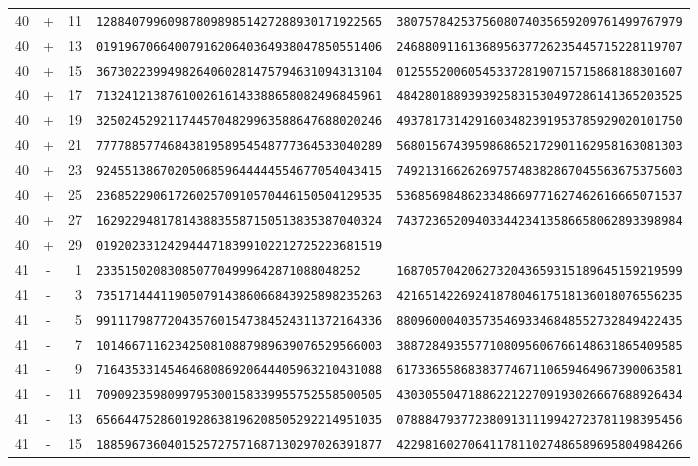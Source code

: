 \begin{longtable}{@{}rcrll@{}}
40&+&11&\texttt{1288407996098780989851427288930171922565}&\texttt{3807578425375608074035659209761499767979}\\
40&+&13&\texttt{0191967066400791620640364938047850551406}&\texttt{2468809116136895637726235445715228119707}\\
40&+&15&\texttt{3673022399498264060281475794631094313104}&\texttt{0125552006054533728190715715868188301607}\\
40&+&17&\texttt{7132412138761002616143388658082496845961}&\texttt{4842801889393925831530497286141365203525}\\
40&+&19&\texttt{3250245292117445704829963588647688020246}&\texttt{4937817314291603482391953785929020101750}\\
40&+&21&\texttt{7777885774684381958954548777364533040289}&\texttt{5680156743959868652172901162958163081303}\\
40&+&23&\texttt{9245513867020506859644444554677054043415}&\texttt{7492131662626975748382867045563675375603}\\
40&+&25&\texttt{2368522906172602570910570446150504129535}&\texttt{5368569848623348669771627462616665071537}\\
40&+&27&\texttt{1629229481781438835587150513835387040324}&\texttt{7437236520940334423413586658062893398984}\\
40&+&29&\texttt{0192023312429444718399102212725223681519}&\texttt{}\\
41&-&1&\texttt{2335150208308507704999642871088048252}&\texttt{1687057042062732043659315189645159219599}\\
41&-&3&\texttt{7351714441190507914386066843925898235263}&\texttt{4216514226924187804617518136018076556235}\\
41&-&5&\texttt{9911179877204357601547384524311372164336}&\texttt{8809600040357354693346848552732849422435}\\
41&-&7&\texttt{1014667116234250810887989639076529566003}&\texttt{3887284935577108095606766148631865409585}\\
41&-&9&\texttt{7164353314546468086920644405963210431088}&\texttt{6173365586838377467110659464967390063581}\\
41&-&11&\texttt{7090923598099795300158339955752558500505}&\texttt{4303055047188622122709193026667688926434}\\
41&-&13&\texttt{6566447528601928638196208505292214951035}&\texttt{0788847937723809131119942723781198395456}\\
41&-&15&\texttt{1885967360401525727571687130297026391877}&\texttt{4229816027064117811027486589695804984266}\\

\end{longtable}
